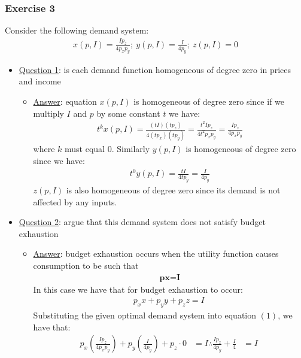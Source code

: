 \documentclass{article}
\begin{document}
\subsubsection{Exercise 3}
Consider the following demand system:
\begin{gather*}
  x(p,I) = \frac{Ip_{z}}{4p_{x}p_{y}}; \ y(p,I) = \frac{I}{4p_{y}}; \ z(p,I) = 0
\end{gather*}
\par \vspace{0.3em}
\begin{itemize}
  \item  \underline{Question 1}: is each demand function homogeneous of degree zero in prices and income
  \begin{itemize}
    \item  \underline{Answer}: equation $x(p,I)$ is homogeneous of degree zero since if we multiply $I$ and $p$ by some constant $t$ we have:
    \begin{gather*}
        t^{k}x(p,I) = \frac{(tI)(tp_{z})}{4(tp_{x})(tp_{y})} = \frac{t^{2}Ip_{z}}{4t^{2}p_{x}p_{y}} = \frac{Ip_{z}}{4p_{x}p_{y}}
    \end{gather*}
    where $k$ must equal 0. Similarly $y(p,I)$ is homogeneous of degree zero since we have:
    \begin{gather*}
      t^{0}y(p,I) = \frac{tI}{4tp_{y}} = \frac{I}{4p_{y}}
    \end{gather*}
    $z(p,I)$ is also homogeneous of degree zero since its demand is not affected by any inputs.
  \end{itemize}
  \item  \underline{Question 2}: argue that this demand system does not satisfy budget exhaustion
  \begin{itemize}
    \item  \underline{Answer}: budget exhaustion occurs when the utility function causes consumption to be such that
    \begin{gather*}
      \textbf{p}\textbf{x} = \textbf{I}
    \end{gather*}
    In this case we have that for budget exhaustion to occur:
    \begin{gather*}
      p_{x}x + p_{y}y + p_{z}z = I \ \tag{1}
    \end{gather*}
    Substituting the given optimal demand system into equation $(1)$, we have that:
    \begin{align*}
      p_{x}(\frac{Ip_{z}}{4p_{x}p_{y}}) + p_{y}(\frac{I}{4p_{y}}) + p_{z} \cdot 0 &= I
      \therefore \frac{Ip_{z}}{4p_{y}} + \frac{I}{4} &= I \ \tag{2}

\end{align*}
\end{itemize}
\end{itemize}
\end{document}
